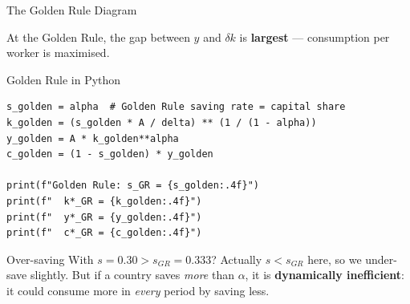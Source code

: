 \documentclass[aspectratio=169, 10pt]{beamer}
\begin{document}
\begin{frame}{The Golden Rule Diagram}
\begin{center}
\end{center}
\vspace{0.3em}
At the Golden Rule, the gap between $y$ and $\delta k$ is \textbf{largest}
--- consumption per worker is maximised.
\end{frame}

\begin{frame}[fragile]{Golden Rule in Python}
\begin{lstlisting}
s_golden = alpha  # Golden Rule saving rate = capital share
k_golden = (s_golden * A / delta) ** (1 / (1 - alpha))
y_golden = A * k_golden**alpha
c_golden = (1 - s_golden) * y_golden

print(f"Golden Rule: s_GR = {s_golden:.4f}")
print(f"  k*_GR = {k_golden:.4f}")
print(f"  y*_GR = {y_golden:.4f}")
print(f"  c*_GR = {c_golden:.4f}")
\end{lstlisting}
\vspace{0.3em}
\begin{alertblock}{Over-saving}
With $s = 0.30 > s_{GR} = 0.333$?  Actually $s < s_{GR}$ here, so we
under-save slightly.  But if a country saves \textit{more} than $\alpha$,
it is \textbf{dynamically inefficient}: it could consume more
in \textit{every} period by saving less.
\end{alertblock}
\end{frame}
\end{document}
